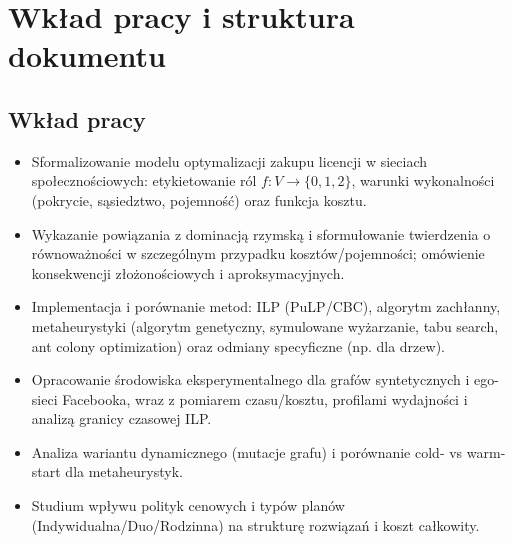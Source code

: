 
\section{Wkład pracy i struktura dokumentu}
\subsection*{Wkład pracy}
\begin{itemize}
  \item Sformalizowanie modelu optymalizacji zakupu licencji w sieciach społecznościowych: etykietowanie ról $f:V\to\{0,1,2\}$, warunki wykonalności (pokrycie, sąsiedztwo, pojemność) oraz funkcja kosztu.
  \item Wykazanie powiązania z dominacją rzymską i sformułowanie twierdzenia o równoważności w szczególnym przypadku kosztów/pojemności; omówienie konsekwencji złożonościowych i aproksymacyjnych.
  \item Implementacja i porównanie metod: ILP (PuLP/CBC), algorytm zachłanny, metaheurystyki (algorytm genetyczny, symulowane wyżarzanie, tabu search, ant colony optimization) oraz odmiany specyficzne (np. dla drzew).
  \item Opracowanie środowiska eksperymentalnego dla grafów syntetycznych i ego-sieci Facebooka, wraz z pomiarem czasu/kosztu, profilami wydajności i analizą granicy czasowej ILP.
  \item Analiza wariantu dynamicznego (mutacje grafu) i porównanie cold- vs warm-start dla metaheurystyk.
  \item Studium wpływu polityk cenowych i typów planów (Indywidualna/Duo/Rodzinna) na strukturę rozwiązań i koszt całkowity.
\end{itemize}

